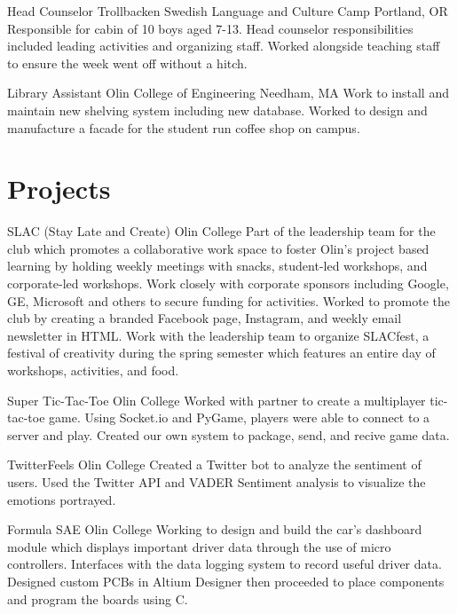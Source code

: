 \documentclass[11.5pt]{moderncv}
\begin{document}
{Head Counselor}
{Trollbacken Swedish Language and Culture Camp}
{Portland, OR}
{}
{Responsible for cabin of 10 boys aged 7-13. Head counselor responsibilities included leading activities and organizing staff. Worked alongside teaching staff to ensure the week went off without a hitch.}

{Library Assistant}
{Olin College of Engineering}
{Needham, MA}
{}
{Work to install and maintain new shelving system including new database. Worked to design and manufacture a facade for the student run coffee shop on campus.}

\vspace{0.05 in}
\section{Projects}

{SLAC (Stay Late and Create)}
{Olin College}
{}
{}
{Part of the leadership team for the club which promotes a collaborative work space to foster Olin's project based learning by holding weekly meetings with snacks, student-led workshops, and corporate-led workshops. Work closely with corporate sponsors including Google, GE, Microsoft and others to secure funding for activities. Worked to promote the club by creating a branded Facebook page, Instagram, and weekly email newsletter in HTML. Work with the leadership team to organize SLACfest, a festival of creativity during the spring semester which features an entire day of workshops, activities, and food.}

{Super Tic-Tac-Toe}
{Olin College}
{}
{}
{Worked with partner to create a multiplayer tic-tac-toe game. Using Socket.io and PyGame, players were able to connect to a server and play. Created our own system to package, send, and recive game data.}

{TwitterFeels}
{Olin College}
{}
{}
{Created a Twitter bot to analyze the sentiment of users. Used the Twitter API and VADER Sentiment analysis to visualize the emotions portrayed.}

{Formula SAE}
{Olin College}
{}
{}
{Working to design and build the car's dashboard module which displays important driver data through the use of micro controllers. Interfaces with the data logging system to record useful driver data. Designed custom PCBs in Altium Designer then proceeded to place components and program the boards using C.}
\end{document}
